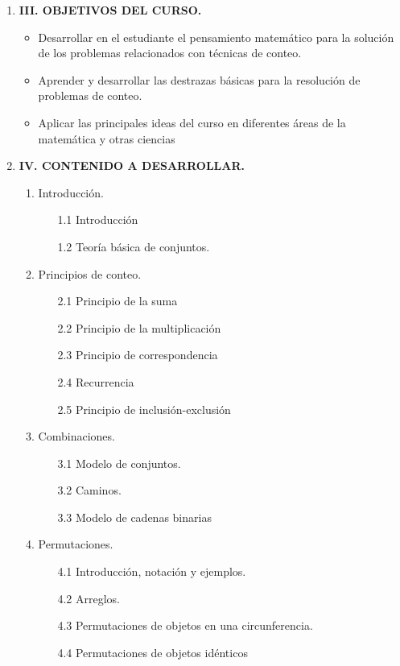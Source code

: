 \begin{enumerate}
\item {\bf \large  III. OBJETIVOS DEL CURSO.}

\begin{itemize}
\item Desarrollar en el estudiante el pensamiento matemático para la solución de los problemas relacionados con técnicas de conteo.
\item  Aprender y desarrollar las destrazas básicas para la resolución de problemas de conteo. 
\item Aplicar las principales ideas del curso en diferentes áreas de la matemática y otras ciencias
\end{itemize}

\newpage 
\item {\bf \large IV. CONTENIDO A DESARROLLAR.}

\begin{enumerate}
\item Introducci\'on.
    
\begin{enumerate}[ ]
\item [1.1] Introducción
\item [1.2]  Teoría básica de conjuntos.
\end{enumerate}
   \item  Principios de conteo.
   \begin{enumerate}[ ]
       \item [2.1] Principio de la suma
       \item [2.2] Principio de la multiplicaci\'on
       \item [2.3] Principio de correspondencia
       \item [2.4] Recurrencia
       \item [2.5] Principio de inclusión-exclusión
   \end{enumerate}

   
   \item Combinaciones.
   \begin{enumerate}
       \item [3.1] Modelo de conjuntos.
       \item [3.2] Caminos.
       \item [3.3] Modelo de cadenas binarias
   \end{enumerate}

    \item Permutaciones.
   \begin{enumerate}
       \item [4.1] Introducci\'on, notaci\'on y ejemplos.
       \item [4.2] Arreglos.
       \item [4.3] Permutaciones de objetos en una circunferencia.
       \item [4.4] Permutaciones de objetos id\'enticos
       

\end{enumerate}
\end{enumerate}
\end{enumerate}
